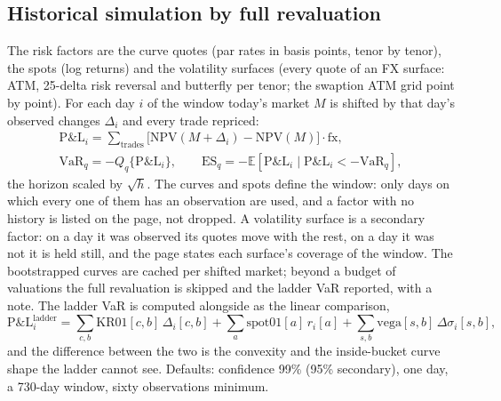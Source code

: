 \documentclass[11pt,a4paper]{article}
\let\plainsubsection\subsection
\renewcommand{\subsection}{\needspace{5\baselineskip}\plainsubsection}
\begin{document}
\subsection{Historical simulation by full revaluation}
The risk factors are the curve quotes (par rates in basis points, tenor by tenor), the spots (log returns) and the volatility surfaces (every quote of an FX surface: ATM, 25-delta risk reversal and butterfly per tenor; the swaption ATM grid point by point). For each day $i$ of the window today's market $M$ is shifted by that day's observed changes $\Delta_i$ and every trade repriced:
\begin{equation}
\begin{gathered}
\mathrm{P\&L}_i=\sum_{\text{trades}}\big[\mathrm{NPV}(M+\Delta_i)-\mathrm{NPV}(M)\big]\cdot \mathrm{fx},\\
\mathrm{VaR}_q=-Q_q\{\mathrm{P\&L}_i\},\qquad \mathrm{ES}_q=-\mathbb{E}[\mathrm{P\&L}_i\mid \mathrm{P\&L}_i<-\mathrm{VaR}_q],
\end{gathered}
\end{equation}
the horizon scaled by $\sqrt h$. The curves and spots define the window: only days on which every one of them has an observation are used, and a factor with no history is listed on the page, not dropped. A volatility surface is a secondary factor: on a day it was observed its quotes move with the rest, on a day it was not it is held still, and the page states each surface's coverage of the window. The bootstrapped curves are cached per shifted market; beyond a budget of valuations the full revaluation is skipped and the ladder VaR reported, with a note. The ladder VaR is computed alongside as the linear comparison,
\begin{equation}
\mathrm{P\&L}_i^{\text{ladder}}=\sum_{c,b}\mathrm{KR01}[c,b]\,\Delta_i[c,b]+\sum_a \mathrm{spot01}[a]\,r_i[a]+\sum_{s,b}\mathrm{vega}[s,b]\,\Delta\sigma_i[s,b],
\end{equation}
and the difference between the two is the convexity and the inside-bucket curve shape the ladder cannot see. Defaults: confidence 99\% (95\% secondary), one day, a 730-day window, sixty observations minimum.
\end{document}
